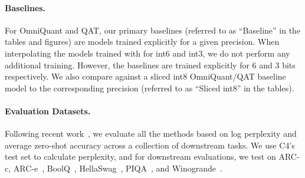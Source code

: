 \vspace{-2mm}
\paragraph{Baselines.} For OmniQuant and QAT, our primary baselines (referred to as ``Baseline'' in the tables and figures) are models trained explicitly for a given precision. When interpolating the models trained with \alg for int6 and int3, we do not perform any additional training. However, the baselines are trained explicitly for 6 and 3 bits respectively. We also compare against a sliced int8 OmniQuant/QAT baseline model to the corresponding precision (referred to as ``Sliced int8'' in the tables).



\vspace{-3mm}
\paragraph{Evaluation Datasets.}
Following recent work~\citep{frantar2022gptq, ma2024affinequant}, we evaluate all the methods based on log perplexity and average zero-shot accuracy across a collection of downstream tasks. We use C4's test set to calculate perplexity, and for downstream evaluations, we test on ARC-c, ARC-e~\citep{DBLP:arc}, BoolQ~\citep{DBLP:boolqa}, HellaSwag~\citep{DBLP:hellaswag}, PIQA~\citep{DBLP:piqa}, and Winogrande~\citep{DBLP:winogrande}.


